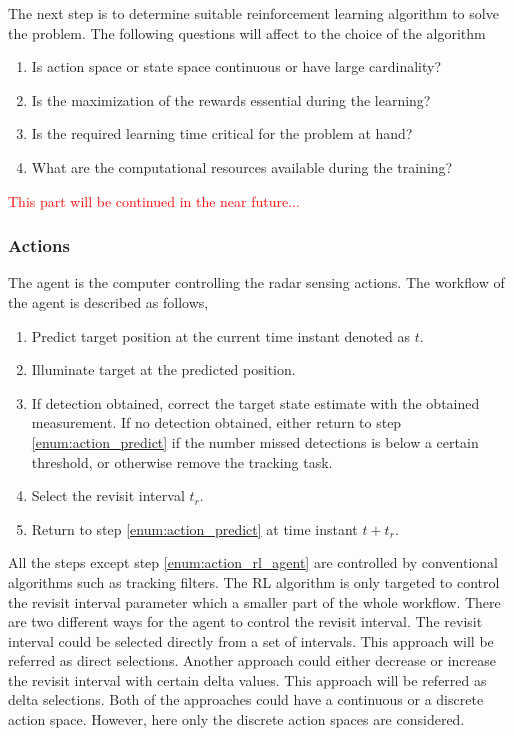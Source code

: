 \documentclass[english, 12pt, a4paper, elec, utf8, a-1b, online]{aaltothesis}
\begin{document}
The next step is to determine suitable reinforcement learning algorithm to solve the problem.
The following questions will affect to the choice of the algorithm
\begin{enumerate}
    \item Is action space or state space continuous or have large cardinality? \label{enum:question_spaces}
    \item Is the maximization of the rewards essential during the learning? \label{enum:on_off_policy}
    \item Is the required learning time critical for the problem at hand? \label{enum:question_learning_speed}
    \item What are the computational resources available during the training? \label{enum:question_resources}
\end{enumerate}
\textcolor{red}{This part will be continued in the near future...}

\subsubsection{Actions} \label{sec:actions}

The agent is the computer controlling the radar sensing actions.
The workflow of the agent is described as follows,
\begin{enumerate}
    \item Predict target position at the current time instant denoted as $t$. \label{enum:action_predict}
    \item Illuminate target at the predicted position.
    \item If detection obtained, correct the target state estimate with the obtained measurement. If no detection obtained, either return to step \ref{enum:action_predict} if the number missed detections is below a certain threshold, or otherwise remove the tracking task.
    \item Select the revisit interval $t_r$. \label{enum:action_rl_agent}
    \item Return to step \ref{enum:action_predict} at time instant $t+t_r$.
\end{enumerate}
All the steps except step \ref{enum:action_rl_agent} are controlled by conventional algorithms such as tracking filters.
The RL algorithm is only targeted to control the revisit interval parameter which a smaller part of the whole workflow.
There are two different ways for the agent to control the revisit interval.
The revisit interval could be selected directly from a set of intervals.
This approach will be referred as direct selections.
Another approach could either decrease or increase the revisit interval with certain delta values.
This approach will be referred as delta selections.
Both of the approaches could have a continuous or a discrete action space.
However, here only the discrete action spaces are considered.
\end{document}
